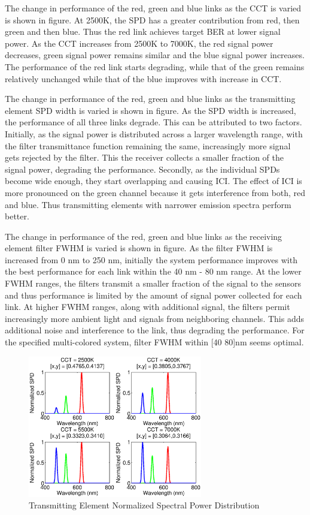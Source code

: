 The change in performance of the red, green and blue links as the CCT is varied is shown in {\color{red}figure}. At 2500K, the SPD has a greater contribution from red, then green and then blue. Thus the red link achieves target BER at lower signal power. As the CCT increases from 2500K to 7000K, the red signal power decreases, green signal power remains similar and the blue signal power increases. The performance of the red link starts degrading, while that of the green remains relatively unchanged while that of the blue improves with increase in CCT.

The change in performance of the red, green and blue links as the transmitting element SPD width is varied is shown in {\color{red}figure}. As the SPD width is increased, the performance of all three links degrade. This can be attributed to two factors. Initially, as the signal power is distributed across a larger wavelength range, with the filter transmittance function remaining the same, increasingly more signal gets rejected by the filter. This the receiver collects a smaller fraction of the signal power, degrading the performance. Secondly, as the individual SPDs become wide enough, they start overlapping and causing ICI. The effect of ICI is more pronounced on the green channel because it gets interference from both, red and blue. Thus transmitting elements with narrower emission spectra perform better.

The change in performance of the red, green and blue links as the receiving element filter FWHM is varied is shown in {\color{red}figure}. As the filter FWHM is increased from 0 nm to 250 nm, initially the system performance improves with the best performance for each link within the 40 nm - 80 nm range. At the lower FWHM ranges, the filters transmit a smaller fraction of the signal to the sensors and thus performance is limited by the amount of signal power collected for each link. At higher FWHM ranges, along with additional signal, the filters permit increasingly more ambient light and signals from neighboring channels. This adds additional noise and interference to the link, thus degrading the performance. For the specified multi-colored system, filter FWHM within [40 80]nm seems optimal.

\begin{figure}
	\centering
		\includegraphics[width=3in]{img/LEDSPD.eps}
	\caption{Transmitting Element Normalized Spectral Power Distribution}
	\label{fig:LEDSPD}
\end{figure}

